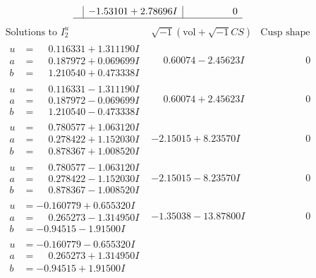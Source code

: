 \documentclass[1p]{elsarticle_modified}
\theoremstyle{definition}
\newcommand{\I}{\sqrt{-1}}
\begin{document}
$$\begin{array}{c|c|c}
 & -1.53101 + 2.78696 I & \phantom{-0.000000 } 0\\
 \hline 
 \end{array}$$\newpage$$\begin{array}{c|c|c}  
\text{Solutions to }I^u_{2}& \I (\text{vol} + \sqrt{-1}CS) & \text{Cusp shape}\\
 \hline 
\begin{aligned}
u &= \phantom{-}0.116331 + 1.311190 I \\
a &= \phantom{-}0.187972 + 0.069699 I \\
b &= \phantom{-}1.210540 + 0.473338 I\end{aligned}
 & \phantom{-}0.60074 - 2.45623 I & \phantom{-0.000000 } 0 \\ \hline\begin{aligned}
u &= \phantom{-}0.116331 - 1.311190 I \\
a &= \phantom{-}0.187972 - 0.069699 I \\
b &= \phantom{-}1.210540 - 0.473338 I\end{aligned}
 & \phantom{-}0.60074 + 2.45623 I & \phantom{-0.000000 } 0 \\ \hline\begin{aligned}
u &= \phantom{-}0.780577 + 1.063120 I \\
a &= \phantom{-}0.278422 + 1.152030 I \\
b &= \phantom{-}0.878367 + 1.008520 I\end{aligned}
 & -2.15015 + 8.23570 I & \phantom{-0.000000 } 0 \\ \hline\begin{aligned}
u &= \phantom{-}0.780577 - 1.063120 I \\
a &= \phantom{-}0.278422 - 1.152030 I \\
b &= \phantom{-}0.878367 - 1.008520 I\end{aligned}
 & -2.15015 - 8.23570 I & \phantom{-0.000000 } 0 \\ \hline\begin{aligned}
u &= -0.160779 + 0.655320 I \\
a &= \phantom{-}0.265273 - 1.314950 I \\
b &= -0.94515 - 1.91500 I\end{aligned}
 & -1.35038 - 13.87800 I & \phantom{-0.000000 } 0 \\ \hline\begin{aligned}
u &= -0.160779 - 0.655320 I \\
a &= \phantom{-}0.265273 + 1.314950 I \\
b &= -0.94515 + 1.91500 I\end{aligned}

\end{array}$$
\end{document}
